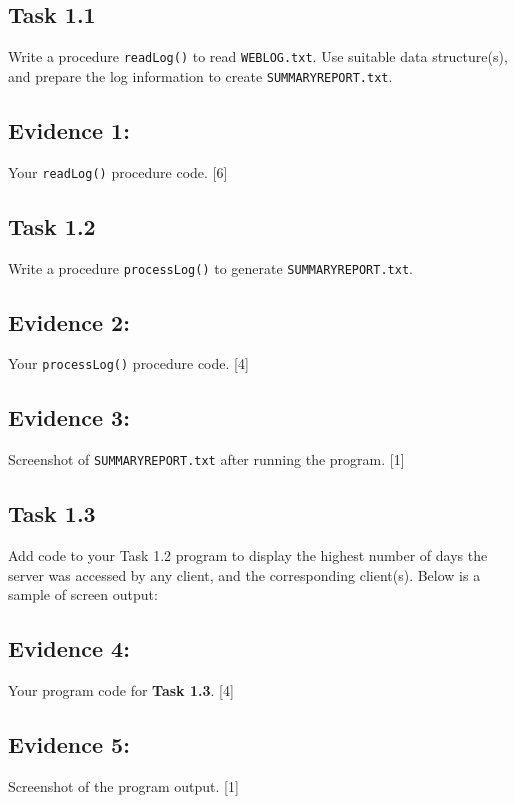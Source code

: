 \subsection*{Task 1.1 }

Write a procedure \texttt{readLog()} to read \texttt{WEBLOG.txt}.
Use suitable data structure(s), and prepare the log information to
create \texttt{SUMMARYREPORT.txt}.

\subsection*{Evidence 1: }

Your \texttt{readLog()} procedure code.\hfill{} {[}6{]}

\subsection*{Task 1.2 }

Write a procedure \texttt{processLog()} to generate \texttt{SUMMARYREPORT.txt}.

\subsection*{Evidence 2: }

Your \texttt{processLog()} procedure code.\hfill{} {[}4{]}

\subsection*{Evidence 3:}

Screenshot of \texttt{SUMMARYREPORT.txt} after running the program.\hfill{}
{[}1{]}

\subsection*{Task 1.3 }

Add code to your Task 1.2 program to display the highest number of
days the server was accessed by any client, and the corresponding
client(s). Below is a sample of screen output:

\noindent{}

\subsection*{Evidence 4:}

Your program code for \textbf{Task 1.3}.\hfill{} {[}4{]}

\subsection*{Evidence 5:}

Screenshot of the program output.\hfill{} {[}1{]}
